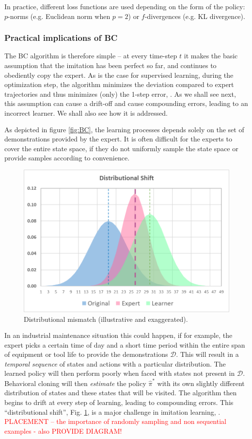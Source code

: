 \documentclass{article}
\begin{document}
In practice, different loss functions are used depending on the form of the policy: $p$-norms (e.g. Euclidean norm when $p=2$) or $f$-divergences (e.g. KL divergence).

\subsubsection{Practical implications of BC}
The BC algorithm is therefore simple -- at every time-step $t$ it makes the basic assumption that the imitation has been perfect so far, and continues to obediently copy the expert. As is the case for supervised learning, during the optimization step, the algorithm minimizes the deviation compared to expert trajectories and thus minimizes (only) the 1-step error, \citep{yue2018imitation}. As we shall see next, this assumption can cause a drift-off and cause compounding errors, leading to an incorrect learner. We shall also see how it is addressed. 

As depicted in figure \ref{fig:BC}, the learning processes depends solely on the set of demonstrations provided by the expert. It is often difficult for the experts to cover the entire state space, if they do not uniformly sample the state space or provide samples according to convenience.

\begin{figure}[H]
\centering
\includegraphics[width=0.6\linewidth]{images/DistributionalShift.png}
\caption{Distributional mismatch (illustrative and exaggerated).}
\label{fig:DistribShift}
\end{figure}

In an industrial maintenance situation this could happen, if for example, the expert picks a certain time of day and a short time period within the entire span of equipment or tool life to provide the demonstrations $\mathcal{D}$.  This will result in a \textit{temporal sequence} of states and actions with a particular distribution. The learned policy will then perform poorly when faced with states not present in $\mathcal{D}$. Behavioral cloning will then \textit{estimate} the policy ${\hat{\pi}}^*$ with its own slightly different distribution of states and these states  that will be visited. The algorithm then begins to drift at every step of learning, leading to compounding errors. This ``distributional shift'', Fig. \ref{fig:DistribShift}, is a major challenge in imitation learning, \citep{yue2018imitation, stanford-lectures}. \textcolor{red}{PLACEMENT -- the importance of randomly sampling and non sequential examples - also PROVIDE DIAGRAM!} 
\end{document}
